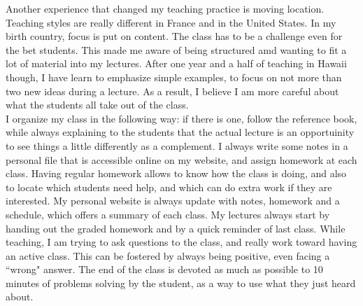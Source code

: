 \documentclass[a4paper]{article}
\begin{document}
Another experience that changed my teaching practice is moving location. Teaching styles are really different in France and in the United States. In my birth country, focus is put on content. The class has to be a challenge even for the bet students. This made me aware of being structured amd wanting to fit a lot of material into my lectures. After one year and a half of teaching in Hawaii though, I have learn to emphasize simple examples, to focus on not more than two new ideas during a lecture. As a result, I believe I am more careful about what the students all take out of the class. \\    

I organize my class in the following way: if there is one, follow the reference book, while always explaining to the students that the actual lecture is an opportuinity to see things a little differently as a complement. I always write some notes in a personal file that is accessible online on my website, and assign homework at each class. Having regular homework allows to know how the class is doing, and also to locate which students need help, and which can do extra work if they are interested. My personal website is always update with notes, homework and a schedule, which offers a summary of each class. My lectures always start by handing out the graded homework and by a quick reminder of last class. While teaching, I am trying to ask questions to the class, and really work toward having an active class. This can be fostered by always being positive, even facing a ``wrong" answer. The end of the class is devoted as much as possible to 10 minutes of problems solving by the student, as a way to use what they just heard about.\\
   
\end{document}
